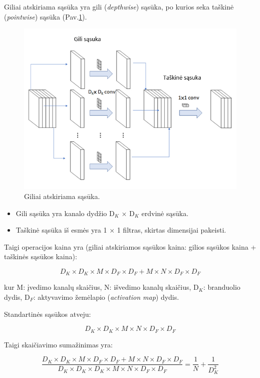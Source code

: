 \documentclass{VUMIFInfKursinis}
\begin{document}
Giliai atskiriama sąsūka yra gili (\textit{depthwise}) sąsūka, po kurios seka taškinė (\textit{pointwise}) sąsūka (Pav.\ref{fig:depthwise_conv2}).

\begin{figure}[h!]
\centering
  \includegraphics[scale=0.7]{img/depthwise_conv2.PNG}
  \caption{Giliai atskiriama sąsūka.}
  \label{fig:depthwise_conv2}
\end{figure}

\begin{itemize}
  \item Gili sąsūka yra kanalo dydžio D$_{K}$ × D$_{K}$ erdvinė sąsūka.
  \item Taškinė sąsūka iš esmės yra 1 × 1 filtras, skirtas dimensijai pakeisti.
\end{itemize}

Taigi operacijos kaina yra (giliai atskiriamos sąsūkos kaina: gilios sąsūkos kaina + taškinės sąsūkos kaina):

\[ D_K \times D_K \times M \times D_F \times D_F + M \times N \times D_F \times D_F \]

kur M: įvedimo kanalų skaičius, N: išvedimo kanalų skaičius, D$_{K}$: branduolio dydis, D$_{F}$: aktyvavimo žemėlapio (\textit{activation map}) dydis.

Standartinės sąsūkos atveju:

\[ D_K \times D_K \times M \times N \times D_F \times D_F \]

Taigi skaičiavimo sumažinimas yra:

\[ \dfrac{D_K \times D_K \times M \times D_F \times D_F + M \times N \times D_F \times D_F}{D_K \times D_K \times D_K  \times M \times N \times D_F \times D_F} = \dfrac{1}{N} + \dfrac{1}{D_K^2} \]
\end{document}
